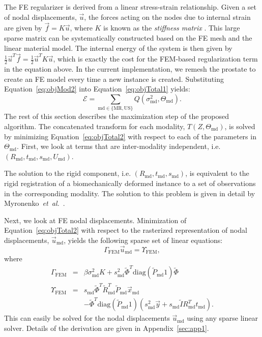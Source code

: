 \documentclass[journal]{IEEEtran}
\newcommand{\trans}[1]{#1^{\scriptscriptstyle T}}
\newcommand{\diag}{\mathrm{diag}}
\begin{document}
The FE regularizer is derived from a linear stress-strain relationship. Given a set of nodal displacements, $\vec{u}$, the forces acting on the nodes due to internal strain are given by $\vec{f} = K\vec{u}$, where $K$ is known as the \emph{stiffness matrix} \cite{Bonet00a}.  This large sparse matrix can be systematically constructed based on the FE mesh and the linear material model.  The internal energy of the system is then given by $\frac{1}{2}\trans{\vec{u}}\vec{f}=\frac{1}{2}\trans{\vec{u}}K\vec{u}$, which is exactly the cost for the FEM-based regularization term in the equation above. In the current implementation, we remesh the prostate to create an FE model every time a new instance is created. Substituting Equation~\ref{eq:objMod2} into Equation~\ref{eq:objTotal1} yields:
\begin{equation} \label{eq:objTotal2}
\mathcal{E} = \sum_{\mathrm{md}\in\{\mathrm{MR},\mathrm{US}\}}Q(\sigma^2_\mathrm{md},\Theta_\mathrm{md}).
\end{equation}
The rest of this section describes the maximization step of the proposed algorithm. The concatenated transform for each modality, $T(Z,\Theta_\mathrm{md})$, is solved by minimizing Equation~\ref{eq:objTotal2} with respect to each of the parameters in $\Theta_\mathrm{md}$. First, we look at terms that are inter-modality independent, i.e. $(R_\mathrm{md},t_\mathrm{md},s_\mathrm{md},U_\mathrm{md})$. 

The solution to the rigid component, i.e.  $(R_\mathrm{md},t_\mathrm{md},s_\mathrm{md})$, is equivalent to the rigid registration of a biomechanically deformed instance to a set of observations in the corresponding modality. The solution to this problem is given in detail by Myronenko~\textit{et~al.}~\cite{Myronenko10a}.  

Next, we look at FE nodal displacements. Minimization of Equation~\ref{eq:objTotal2} with respect to the rasterized representation of nodal displacements, $\vec{u}_\mathrm{md}$, yields the following sparse set of linear equations:
\begin{equation} \label{eq:FEM1}
\Gamma_{\mathrm{FEM}}\vec{u}_\mathrm{md} = \Upsilon_\mathrm{FEM},
\end{equation}
where 
\begin{eqnarray} \label{eq:FEM2}
 \Gamma_{\mathrm{FEM}} &=& \beta \sigma_\mathrm{md}^2K + s^2_\mathrm{md}\trans{\tilde{\Phi}}\diag\left(\tilde{P}_\mathrm{md}1\right)\tilde{\Phi}\\
 \Upsilon_{\mathrm{FEM}} &=& s_\mathrm{md}\trans{\tilde{\Phi}}\trans{\tilde{R}}_\mathrm{md}\tilde{P}_\mathrm{md}\vec{x}_\mathrm{md}\nonumber\\
 && -\trans{\tilde{\Phi}}\diag\left(\tilde{P}_\mathrm{md}1\right)\left(s_\mathrm{md}^2\vec{y}+s_\mathrm{md}\tilde{I}\trans{R_\mathrm{md}}t_\mathrm{md}\right)\nonumber.
\end{eqnarray}
This can easily be solved for the nodal displacements $\vec{u}_\mathrm{md}$ using any sparse linear solver. Details of the derivation are given in Appendix~\ref{sec:app1}.
\end{document}
